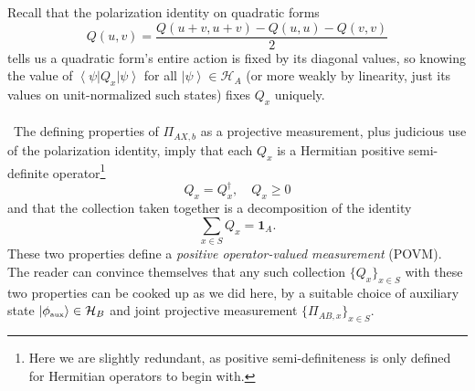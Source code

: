 \documentclass[11pt,letterpaper]{article}
\newcommand{\mc}[1]{\mathcal{#1}}
\newcommand{\KET}[1]{\left| #1 \right\rangle }
\newcommand{\BRA}[1]{\left\langle #1 \right| }
\begin{document}
Recall that the polarization identity on quadratic forms \begin{equation}
Q(u, v) = \frac{Q(u+v, u+v) - Q(u,u) - Q(v,v)}{2}
\end{equation}
tells us a quadratic form's entire action is fixed by its diagonal values, so knowing the value of $\BRA{\psi} Q_x \KET{\psi}$ for all $\KET{\psi} \in \mc{H}_A$ (or more weakly by linearity, just its values on unit-normalized such states) fixes $Q_x$ uniquely.\\
\\
\
The defining properties of $\Pi_{AX,b}$ as a projective measurement, plus judicious use of the polarization identity, imply that each $Q_x$ is a Hermitian positive semi-definite operator\footnote{Here we are slightly redundant, as positive semi-definiteness is only defined for Hermitian operators to begin with.} \begin{equation}
Q_x = Q_x^\dagger, \quad Q_x \geq 0
\end{equation}
and that the collection taken together is a decomposition of the identity \begin{equation}
\sum_{x \in S} Q_x = \mathbf{1}_A.
\end{equation}
These two properties define a \textit{positive operator-valued measurement} (POVM). The reader can convince themselves that any such collection $\{Q_x\}_{x \in S}$ with these two properties can be cooked up as we did here, by a suitable choice of auxiliary state $\KET{\phi_{\mbox{\tiny{aux}}}} \in \mc{H}_B$ and joint projective measurement $\{\Pi_{AB,x} \}_{x \in S}$.





\end{document}

